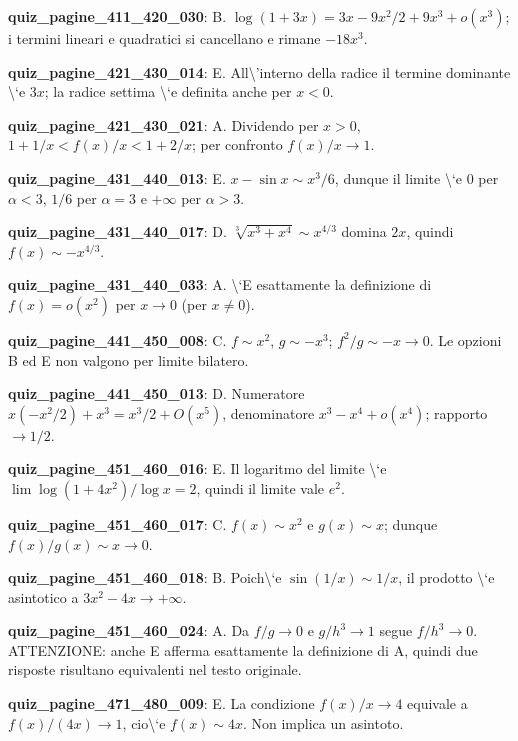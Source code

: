 \documentclass[11pt,a4paper]{article}
\newcounter{quiz}
\begin{document}
\noindent\textbf{quiz\_pagine\_411\_420\_030}: B. $\log(1+3x)=3x-9x^2/2+9x^3+o(x^3)$; i termini lineari e quadratici si cancellano e rimane $-18x^3$.\par\medskip
\noindent\textbf{quiz\_pagine\_421\_430\_014}: E. All\textbackslash{}'interno della radice il termine dominante \textbackslash{}`e $3x$; la radice settima \textbackslash{}`e definita anche per $x<0$.\par\medskip
\noindent\textbf{quiz\_pagine\_421\_430\_021}: A. Dividendo per $x>0$, $1+1/x<f(x)/x<1+2/x$; per confronto $f(x)/x\to1$.\par\medskip
\noindent\textbf{quiz\_pagine\_431\_440\_013}: E. $x-\sin x\sim x^3/6$, dunque il limite \textbackslash{}`e $0$ per $\alpha<3$, $1/6$ per $\alpha=3$ e $+\infty$ per $\alpha>3$.\par\medskip
\noindent\textbf{quiz\_pagine\_431\_440\_017}: D. $\sqrt[3]{x^3+x^4}\sim x^{4/3}$ domina $2x$, quindi $f(x)\sim-x^{4/3}$.\par\medskip
\noindent\textbf{quiz\_pagine\_431\_440\_033}: A. \textbackslash{}`E esattamente la definizione di $f(x)=o(x^2)$ per $x\to0$ (per $x\ne0$).\par\medskip
\noindent\textbf{quiz\_pagine\_441\_450\_008}: C. $f\sim x^2$, $g\sim-x^3$; $f^2/g\sim-x\to0$. Le opzioni B ed E non valgono per limite bilatero.\par\medskip
\noindent\textbf{quiz\_pagine\_441\_450\_013}: D. Numeratore $x(-x^2/2)+x^3=x^3/2+O(x^5)$, denominatore $x^3-x^4+o(x^4)$; rapporto $\to1/2$.\par\medskip
\noindent\textbf{quiz\_pagine\_451\_460\_016}: E. Il logaritmo del limite \textbackslash{}`e $\lim\log(1+4x^2)/\log x=2$, quindi il limite vale $e^2$.\par\medskip
\noindent\textbf{quiz\_pagine\_451\_460\_017}: C. $f(x)\sim x^2$ e $g(x)\sim x$; dunque $f(x)/g(x)\sim x\to0$.\par\medskip
\noindent\textbf{quiz\_pagine\_451\_460\_018}: B. Poich\textbackslash{}`e $\sin(1/x)\sim1/x$, il prodotto \textbackslash{}`e asintotico a $3x^2-4x\to+\infty$.\par\medskip
\noindent\textbf{quiz\_pagine\_451\_460\_024}: A. Da $f/g\to0$ e $g/h^3\to1$ segue $f/h^3\to0$. ATTENZIONE: anche E afferma esattamente la definizione di A, quindi due risposte risultano equivalenti nel testo originale.\par\medskip
\noindent\textbf{quiz\_pagine\_471\_480\_009}: E. La condizione $f(x)/x\to4$ equivale a $f(x)/(4x)\to1$, cio\textbackslash{}`e $f(x)\sim4x$. Non implica un asintoto.\par\medskip
\end{document}
